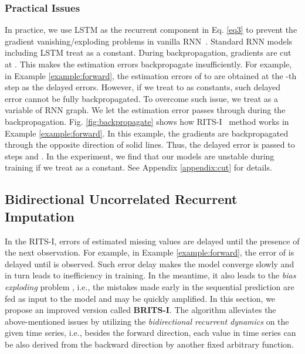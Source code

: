 \documentclass{article}
\newcommand{\ritsi}{\xspace{RITS-I}}
\newcommand{\britsi}{\xspace{BRITS-I}}
\begin{document}
\subsubsection{Practical Issues}


In practice, we use LSTM as the recurrent component in Eq. \eqref{eq3} to prevent the gradient vanishing/exploding problems in vanilla RNN~\cite{DeepBook}. Standard RNN models including LSTM treat   as a constant. During backpropagation, gradients are cut at . This makes the estimation errors backpropagate insufficiently.
For example, in Example \ref{example:forward}, the estimation errors of  to  are obtained at the -th step as the delayed errors. However, if we treat  to  as constants, such delayed error cannot be fully backpropagated. To overcome such issue, we treat  as a variable of RNN graph. We let the estimation error passes through  during the backpropagation.
Fig. \ref{fig:backpropagate} shows how \ritsi~ method works in Example \ref{example:forward}. In this example, the gradients are backpropagated through the opposite direction of solid lines. Thus, the delayed error  is passed to steps  and . In the experiment, we find that our models are unstable during training if we treat  as a constant. 
See Appendix \ref{appendix:cut} for details.




\subsection{Bidirectional Uncorrelated Recurrent Imputation}
\label{sec:bi-direct}
In the \ritsi, errors of estimated missing values are delayed until the presence of the next observation.
For example, in Example \ref{example:forward}, the error of  is delayed until  is observed. Such error delay makes the model converge slowly and in turn leads to inefficiency in training.  
In the meantime, it also leads to the {\em bias exploding} problem \cite{bengio2015scheduled}, i.e., the mistakes made early in the sequential prediction are fed as input to the model and may be quickly amplified. In this section, we propose an improved version called {\bf \britsi}. The  algorithm alleviates the above-mentioned issues by utilizing the {\em bidirectional recurrent dynamics} on the given time series, i.e., besides the forward direction, each value in time series can be also derived from the backward direction by another fixed arbitrary function.
\end{document}
